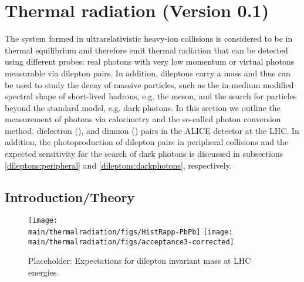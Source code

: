 \documentclass[../report.tex]{subfiles}
\providecommand{\main}{..}
\begin{document}
\section{Thermal radiation (Version 0.1)}

The system formed in ultrarelativistic heavy-ion collisions is considered to be in thermal equilibrium and therefore emit thermal radiation that can be detected using different probes: real photons with very low momentum or virtual photons measurable via dilepton pairs. In addition, dileptons carry a mass and thus can be used to study the decay of massive particles, such as the in-medium modified spectral shape of short-lived hadrons, e.g. the \Prho meson, and the search for particles beyond the standard model, e.g. dark photons. In this section we outline the measurement of photons via calorimetry and the so-called photon conversion method, dielectron (\Pepem), and dimuon (\PGmpGmm) pairs in the ALICE detector at the LHC. In addition, the photoproduction of dilepton pairs in peripheral collisions and the expected sensitivity for the search of dark photons is discussed in subsections \ref{dileptons:peripheral} and \ref{dileptons:darkphotons}, respectively.

\subsection{Introduction/Theory}


\begin{figure}[htb]
\centering
\texttt{[image: \\main/thermalradiation/figs/HistRapp-PbPb]}
\texttt{[image: \\main/thermalradiation/figs/acceptance3-corrected]}
\caption{Placeholder: Expectations for dilepton invariant mass at LHC energies.}
\label{fig:LHCExpectations_Rapp_pHSD}
\end{figure}
\end{document}
